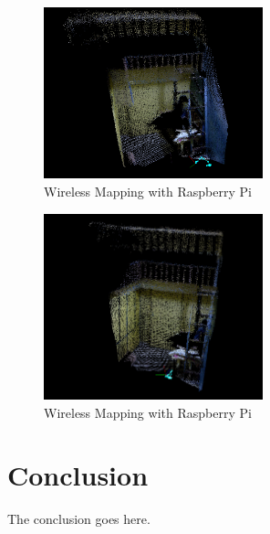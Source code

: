 \documentclass[journal]{IEEEtran}
\begin{document}
\begin{figure}[ht]
	\centering
	\includegraphics[width=2.5in]{2(1).png}
	\caption{Wireless Mapping with Raspberry Pi}
	\label{fig_sim}
\end{figure}

\begin{figure}[ht]
	\centering
	\includegraphics[width=2.5in]{2(2).png}
	\caption{Wireless Mapping with Raspberry Pi}
	\label{fig_sim}
\end{figure}

\section{Conclusion}
The conclusion goes here.






%
\end{document}
